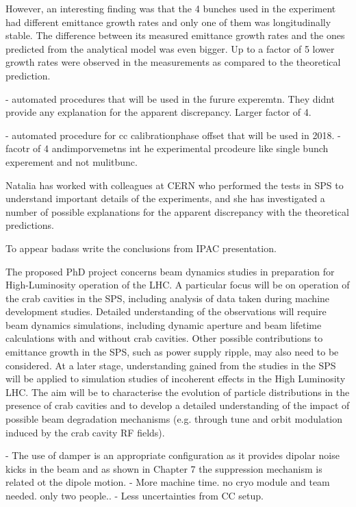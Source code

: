 However, an interesting finding was that the 4 bunches used in the experiment had different emittance growth rates and only one of them was longitudinally stable. The difference between its measured emittance growth rates and the ones predicted from the analytical model was even bigger. Up to a factor of 5 lower growth rates were observed in the measurements as compared to the theoretical prediction.



- automated procedures that will be used in the furure experemtn. They didnt provide any explanation for the apparent discrepancy. Larger factor of 4.



-  automated procedure for cc calibrationphase offset that will be used in 2018. 
- facotr of 4 andimporvemetns int he experimental prcodeure like single bunch experement and not mulitbunc.


Natalia has worked with colleagues at CERN who performed the tests in SPS to understand important details of the experiments, and she has investigated a number of possible explanations for the apparent discrepancy with the theoretical predictions.


To appear badass write the conclusions from IPAC presentation.


The proposed PhD project concerns beam dynamics studies in preparation for High-Luminosity operation of the LHC. A particular focus will be on operation of the crab cavities in the SPS, including analysis of data taken during machine development studies. Detailed understanding of the observations will require beam dynamics simulations, including dynamic aperture and beam lifetime calculations with and without crab cavities. Other possible contributions to emittance growth in the SPS, such as power supply ripple, may also need to be considered. At a later stage, understanding gained from the studies in the SPS will be applied to simulation studies of incoherent effects in the High Luminosity LHC. The aim will be to characterise the evolution of particle distributions in the presence of crab cavities and to develop a detailed understanding of the impact of possible beam degradation mechanisms (e.g. through tune and orbit modulation induced by the crab cavity RF fields).


\newpage
- The use of damper is an appropriate configuration as it provides dipolar noise kicks in the beam and as shown in Chapter 7 the suppression mechanism is related ot the dipole motion. 
- More machine time. no cryo module and team needed. only two people..
- Less uncertainties from CC setup.




